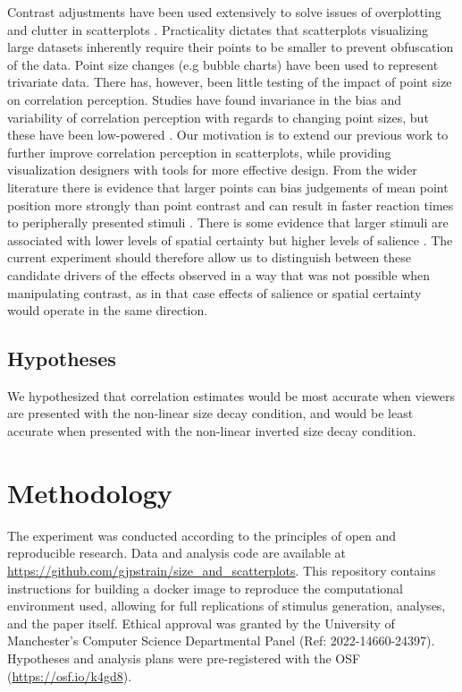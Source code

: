 \documentclass{vgtc}                          %
\begin{document}
Contrast adjustments have been used extensively to solve issues of overplotting and clutter
in scatterplots \cite{matejka_2015, bertini_2004}. Practicality dictates that
scatterplots visualizing large datasets inherently require their points to be
smaller to prevent obfuscation of the data. Point size changes (e.g bubble charts)
have been used to represent trivariate data. There has, however, been little testing of the
impact of point size on correlation perception. Studies have found
invariance in the bias and variability of correlation
perception with regards to changing point sizes, but these have been low-powered
\cite{rensink_2012, rensink_2014}. Our motivation is to extend our previous work
\cite{strain_2023} to further improve correlation perception in scatterplots, while
providing visualization designers with tools for more effective design.
From the wider literature there is evidence that larger points can bias judgements of
mean point position more strongly than point contrast \cite{hong_2021} and can
result in faster reaction times to peripherally presented stimuli \cite{grice_1983}.
There is some evidence that larger stimuli are associated with lower levels of
spatial certainty \cite{alais_2004} but higher levels of salience \cite{healey_2012}.
The current experiment should therefore allow us to distinguish between these
candidate drivers of the effects observed in a way that was not possible
when manipulating contrast, as in that case effects of salience or spatial
certainty would operate in the same direction.

\hypertarget{hypotheses}{%
\subsection{Hypotheses}\label{hypotheses}}

We hypothesized that correlation estimates would be most accurate when
viewers are presented with the non-linear size decay condition, and would be
least accurate when presented with the non-linear inverted size decay condition.

\hypertarget{methodology}{%
\section{Methodology}\label{methodology}}

The experiment was conducted according to the principles of open and reproducible research.
Data and analysis code are available at \url{https://github.com/gjpstrain/size_and_scatterplots}.
This repository contains instructions for building a docker image to
reproduce the computational environment used, allowing for full replications
of stimulus generation, analyses, and the paper itself. Ethical approval was granted by the University
of Manchester's Computer Science Departmental Panel (Ref: 2022-14660-24397).
Hypotheses and analysis plans were pre-registered with the OSF (\url{https://osf.io/k4gd8}).
\end{document}
